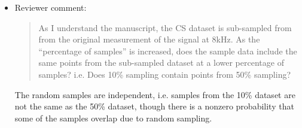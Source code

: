 \documentclass[10pt,a4paper,twoside]{article}
\begin{document}
\begin{itemize}
\item Reviewer comment:

\begin{quote}
	As I understand the manuscript, the CS dataset is sub-sampled from from the original measurement of the signal at 8kHz. As the “percentage of samples” is increased, does the sample data include the same points from the sub-sampled dataset at a lower percentage of samples? i.e. Does 10\% sampling contain points from 50\% sampling? 
\end{quote}

The random samples are independent, i.e. samples from the 10\% dataset are not the same as the 50\% dataset, though there is a nonzero probability that some of the samples overlap due to random sampling.

\end{itemize}
\end{document}
